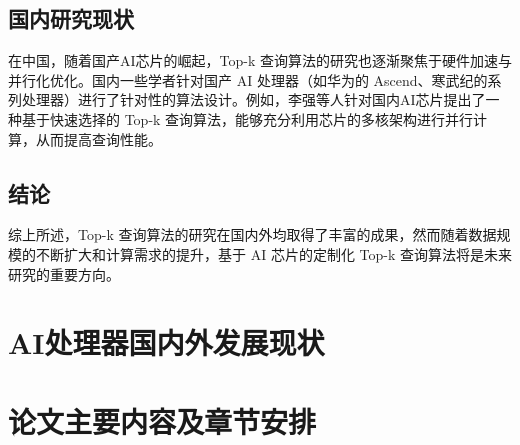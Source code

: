 \subsection{国内研究现状}
在中国，随着国产AI芯片的崛起，Top-k 查询算法的研究也逐渐聚焦于硬件加速与并行化优化。国内一些学者针对国产 AI 处理器（如华为的 Ascend、寒武纪的系列处理器）进行了针对性的算法设计。例如，李强等人针对国内AI芯片提出了一种基于快速选择的 Top-k 查询算法，能够充分利用芯片的多核架构进行并行计算，从而提高查询性能\cite{li2022topk}。


\subsection{结论}
综上所述，Top-k 查询算法的研究在国内外均取得了丰富的成果，然而随着数据规模的不断扩大和计算需求的提升，基于 AI 芯片的定制化 Top-k 查询算法将是未来研究的重要方向。


\section{AI处理器国内外发展现状}
\section{论文主要内容及章节安排}
